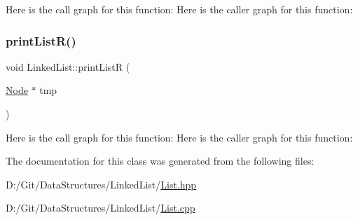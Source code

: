 Here is the call graph for this function\+:
Here is the caller graph for this function\+:
\mbox{\label{class_linked_list_a2d03b30bf762af404a7a687aceff7123}} 
\subsubsection{\texorpdfstring{print\+List\+R()}{printListR()}}
{\footnotesize\ttfamily void Linked\+List\+::print\+ListR (\begin{DoxyParamCaption}\item[{\hyperlink{class_node}{Node} $\ast$}]{tmp }\end{DoxyParamCaption})}

Here is the call graph for this function\+:
Here is the caller graph for this function\+:


The documentation for this class was generated from the following files\+:\begin{DoxyCompactItemize}
\item 
D\+:/\+Git/\+Data\+Structures/\+Linked\+List/\hyperlink{_list_8hpp}{List.\+hpp}\item 
D\+:/\+Git/\+Data\+Structures/\+Linked\+List/\hyperlink{_list_8cpp}{List.\+cpp}\end{DoxyCompactItemize}
